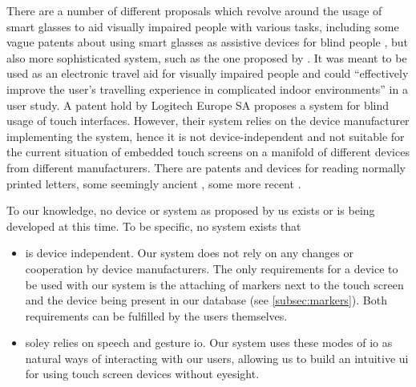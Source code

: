 There are a number of different proposals which revolve around the usage of smart glasses to aid visually impaired people with various tasks, including some vague patents about using smart glasses as assistive devices for blind people \autocite{smartglasses, smartglasses2, smartglasses3}, but also more sophisticated system, such as the one proposed by \textcite{bai2017smart}.
It was meant to be used as an electronic travel aid for visually impaired people and could \enquote{effectively improve the user's travelling experience in complicated indoor environments} in a user study.
A patent hold by Logitech Europe SA \autocite{logitech} proposes a system for blind usage of touch interfaces.
However, their system relies on the device manufacturer implementing the system, hence it is not device-independent and not suitable for the current situation of embedded touch screens on a manifold of different devices from different manufacturers.
There are patents and devices for reading normally printed letters, some seemingly ancient \cite{ring}, some more recent \cite{ring2}.

To our knowledge, no device or system as proposed by us exists or is being developed at this time.
To be specific, no system exists that 
\begin{itemize}
	\item
		is device independent.
		Our system does not rely on any changes or cooperation by device manufacturers.
		The only requirements for a device to be used with our system is the attaching of markers next to the touch screen and the device being present in our database (see \autoref{subsec:markers}).
		Both requirements can be fulfilled by the users themselves.
	\item
		soley relies on speech and gesture \ac{io}.
		Our system uses these modes of \ac{io} as natural ways of interacting with our users, allowing us to build an intuitive \ac{ui} for using touch screen devices without eyesight.
\end{itemize}




